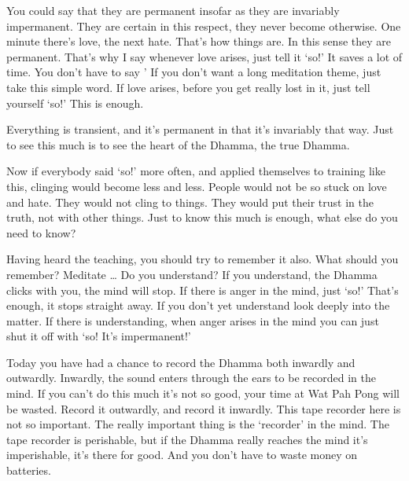 You could say that they are permanent insofar as they are invariably impermanent. They are certain in this respect, they never become otherwise. One minute there's love, the next hate. That's how things are. In this sense they are permanent. That's why I say whenever love arises, just tell it `so!' It saves a lot of time. You don't have to say   ' If you don't want a long meditation theme, just take this simple word. If love arises, before you get really lost in it, just tell yourself `so!' This is enough. 

Everything is transient, and it's permanent in that it's invariably that way. Just to see this much is to see the heart of the Dhamma, the true Dhamma. 

Now if everybody said `so!' more often, and applied themselves to training like this, clinging would become less and less. People would not be so stuck on love and hate. They would not cling to things. They would put their trust in the truth, not with other things. Just to know this much is enough, what else do you need to know? 

Having heard the teaching, you should try to remember it also. What should you remember? Meditate \ldots{} Do you understand? If you understand, the Dhamma clicks with you, the mind will stop. If there is anger in the mind, just `so!' That's enough, it stops straight away. If you don't yet understand look deeply into the matter. If there is understanding, when anger arises in the mind you can just shut it off with `so! It's impermanent!' 

Today you have had a chance to record the Dhamma both inwardly and outwardly. Inwardly, the sound enters through the ears to be recorded in the mind. If you can't do this much it's not so good, your time at Wat Pah Pong will be wasted. Record it outwardly, and record it inwardly. This tape recorder here is not so important. The really important thing is the `recorder' in the mind. The tape recorder is perishable, but if the Dhamma really reaches the mind it's imperishable, it's there for good. And you don't have to waste money on batteries.  
